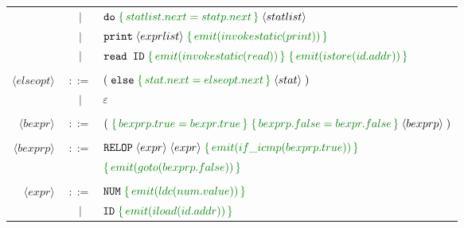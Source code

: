 \documentclass[a4paper]{article}
\newcommand{\cmd}[1]{\textcolor{MyGreen}{\{\, #1 \,\}} \;}
\newcommand{\node}[1]{\langle #1 \rangle \;}
\newcommand{\tag}[1]{\texttt{#1} \;}
\begin{document}
\begin{center}
\begin{tabular}{ r c l }
                      &  $|$  & $\tag{do} \cmd{statlist.next = statp.next} \node{statlist}$ \\

                      &  $|$  & $\tag{print} \node{exprlist} \cmd{emit(invokestatic(print))}$ \\

                      &  $|$  & $\texttt{read ID}\; \cmd{emit(invokestatic(read))} \cmd{emit(istore(id.addr))}$ \\\\
  $\node{elseopt}$    & $::=$ & $(\; \tag{else} \cmd{stat.next = elseopt.next} \node{stat})$ \\
                      &  $|$  & $\varepsilon$ \\\\
  $\node{bexpr}$      & $::=$ & $(\; \cmd{bexprp.true = bexpr.true} \cmd{bexprp.false = bexpr.false} \node{bexprp} )$ \\\\
  $\node{bexprp}$     & $::=$ & $\tag{RELOP} \node{expr} \node{expr} \cmd{emit(if\_icmp(bexprp.true))}$ \\
                      &       & $\cmd{emit(goto(bexprp.false))}$ \\\\
  $\node{expr}$       & $::=$ & $\tag{NUM} \cmd{emit(ldc(num.value))}$ \\

                      &  $|$  & $\tag{ID} \cmd{emit(iload(id.addr))}$\\


\end{tabular}
\end{center}
\end{document}
